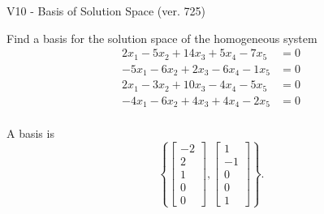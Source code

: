 \begin{exercise}
  \begin{exerciseTitle}V10 - Basis of Solution Space (ver. 725)\end{exerciseTitle}
  \begin{exerciseStatement}
    Find a basis for the solution space of the homogeneous system 
\begin{align*}
 2 x_ 1 -5 x_ 2 + 14 x_ 3 + 5 x_ 4 -7 x_ 5 &= 0  \\ 
  -5 x_ 1 -6 x_ 2 + 2 x_ 3 -6 x_ 4 -1 x_ 5 &= 0  \\ 
  2 x_ 1 -3 x_ 2 + 10 x_ 3 -4 x_ 4 -5 x_ 5 &= 0  \\ 
  -4 x_ 1 -6 x_ 2 + 4 x_ 3 + 4 x_ 4 -2 x_ 5 &= 0  \\ 
 \end{align*}


 
  \end{exerciseStatement}

  \begin{exerciseAnswer}
   A basis is   
\[\left\{\left[\begin{array}{c}
-2 \\
2 \\
1 \\
0 \\
0
\end{array}\right] , \left[\begin{array}{c}
1 \\
-1 \\
0 \\
0 \\
1
\end{array}\right]\right\}.\]

  


  \end{exerciseAnswer}
\end{exercise}